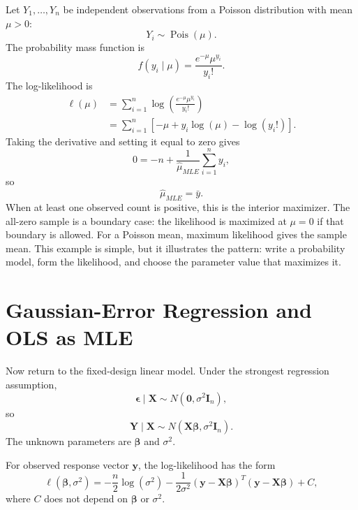 Let \(Y_1,\ldots,Y_n\) be independent observations from a Poisson distribution with mean \(\mu>0\):
\begin{equation}
  Y_i\sim \operatorname{Pois}(\mu).
\end{equation}
The probability mass function is
\begin{equation}
  f(y_i\mid \mu)=\frac{e^{-\mu}\mu^{y_i}}{y_i!}.
\end{equation}
The log-likelihood is
\begin{align}
  \ell(\mu)
  &=\sum_{i=1}^n \log\left(\frac{e^{-\mu}\mu^{y_i}}{y_i!}\right) \\
  &=\sum_{i=1}^n \left[-\mu+y_i\log(\mu)-\log(y_i!)\right].
\end{align}
Taking the derivative and setting it equal to zero gives
\begin{equation}
  0=-n+\frac{1}{\widehat{\mu}_{MLE}}\sum_{i=1}^n y_i,
\end{equation}
so
\begin{equation}
  \boxed{\widehat{\mu}_{MLE}=\bar{y}.}
\end{equation}
When at least one observed count is positive, this is the interior maximizer.  The all-zero sample is a boundary case: the likelihood is maximized at \(\mu=0\) if that boundary is allowed.
For a Poisson mean, maximum likelihood gives the sample mean.  This example is simple, but it illustrates the pattern: write a probability model, form the likelihood, and choose the parameter value that maximizes it.

\section{Gaussian-Error Regression and OLS as MLE}

Now return to the fixed-design linear model.  Under the strongest regression assumption,
\begin{equation}
  \boldsymbol{\epsilon}\mid\mathbf{X}
  \sim N(\mathbf{0},\sigma^2\mathbf{I}_n),
\end{equation}
so
\begin{equation}
  \mathbf{Y}\mid\mathbf{X}
  \sim N(\mathbf{X}\boldsymbol{\beta},\sigma^2\mathbf{I}_n).
  \label{eq:ch14-gaussian-linear-model}
\end{equation}
The unknown parameters are \(\boldsymbol{\beta}\) and \(\sigma^2\).

For observed response vector \(\mathbf{y}\), the log-likelihood has the form
\begin{equation}
  \ell(\boldsymbol{\beta},\sigma^2)
  = -\frac{n}{2}\log(\sigma^2)
    -\frac{1}{2\sigma^2}(\mathbf{y}-\mathbf{X}\boldsymbol{\beta})^T
    (\mathbf{y}-\mathbf{X}\boldsymbol{\beta})
    + C,
  \label{eq:ch14-gaussian-loglik}
\end{equation}
where \(C\) does not depend on \(\boldsymbol{\beta}\) or \(\sigma^2\).

